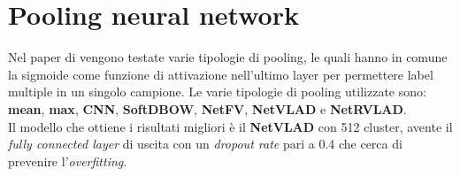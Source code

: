 \section{Pooling neural network \cite{soccerNet}}
Nel paper di \citet{soccerNet} vengono testate varie tipologie di pooling, le quali hanno in comune la sigmoide come funzione di attivazione nell'ultimo layer per permettere label multiple in un singolo campione.
Le varie tipologie di pooling utilizzate sono: \textbf{mean}, \textbf{max}, \textbf{CNN}, \textbf{SoftDBOW}, \textbf{NetFV}, \textbf{NetVLAD} e \textbf{NetRVLAD}. \cite{MiechPooling}
\\Il modello che ottiene i risultati migliori è il \textbf{NetVLAD} con 512 cluster, avente il \textit{fully connected layer} di uscita con un  \textit{dropout rate} pari a 0.4 che cerca di prevenire l'\textit{overfitting}.

